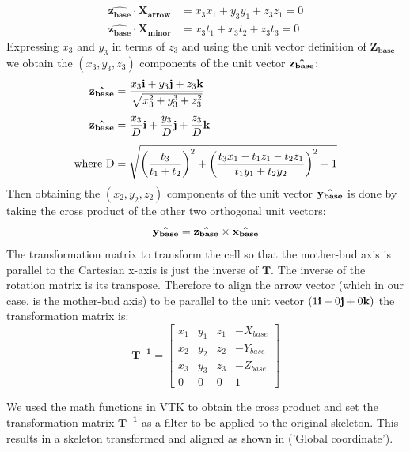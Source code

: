 \begin{align}
\mathbf{\hat{z_{base}}}\cdot \mathbf{X_{arrow}} &= x_3x_1+y_3y_1+z_3z_1=0 \nonumber \\
\mathbf{\hat{z_{base}}}\cdot \mathbf{X_{minor}} &= x_3t_1+x_3t_2+z_3t_3=0
\end{align}
Expressing $x_3$ and $y_3$ in terms of $z_3$ and using the unit vector definition of $\mathbf{Z_{base}}$ we obtain the $(x_3, y_3, z_3)$ components of the unit vector $\mathbf{\hat{z_{base}}}$:
\begin{equation}
 	\begin{split}
	 	\begin{aligned}
	 		\mathbf{\hat{z_{base}}} &= \frac {x_3\mathbf{i}+y_3\mathbf{j}+z_3\mathbf{k}}{\sqrt{x_3^2+y_3^3+z_3^2}}\\[1ex]
	 		\mathbf{\hat{z_{base}}} &= \frac{x_3}{D}\mathbf{i}+\frac{y_3}{D}\mathbf{j}+\frac{z_3}{D}\mathbf{k} \\[1ex]
	 		\text{where D}&= \sqrt{\left(\frac{t_3}{t_1+t_2}\right)^2 +\left( \frac{t_3 x_1-t_1 z_1-t_2 z_1}{t_1 y_1+t_2 y_2}\right)^2+1}
		\end{aligned}
	\end{split}
\end{equation}	 	
Then obtaining the $(x_2, y_2, z_2)$ components of the unit vector $\mathbf{\hat{y_{base}}}$ is done by taking the cross product of the other two orthogonal unit vectors:
\begin{equation}
\mathbf{\hat{y_{base}}}=\mathbf{\hat{z_{base}}}\times\mathbf{\hat{x_{base}}}
\end{equation}
The transformation matrix to transform the cell so that the mother-bud axis is parallel to the Cartesian x-axis is just the inverse of $\mathbf{T}$. The inverse of the rotation matrix is its transpose. Therefore to align the arrow vector (which in our case, is the mother-bud axis) to be parallel to the unit vector $(1\mathbf{i}+0\mathbf{j}+0\mathbf{k})$ the transformation matrix is:
\begin{equation}
		\mathbf{T^{-1}}=\begin{bmatrix}
			 		x_{1} &y_{1}&z_{1}& -X_{base}\\
			 		x_{2} &y_{2}&z_{2}&-Y_{base}\\
			 		x_{3} &y_{3}&z_{3}& -Z_{base}\\
			 		0&0&0&1
		 		\end{bmatrix}		
	\end{equation}

We used the math functions in VTK to obtain the cross product and set the transformation matrix $\mathbf{T^{-1}}$ as a filter to be applied to the original skeleton. This results in a skeleton transformed and aligned as shown in  ('Global coordinate').

